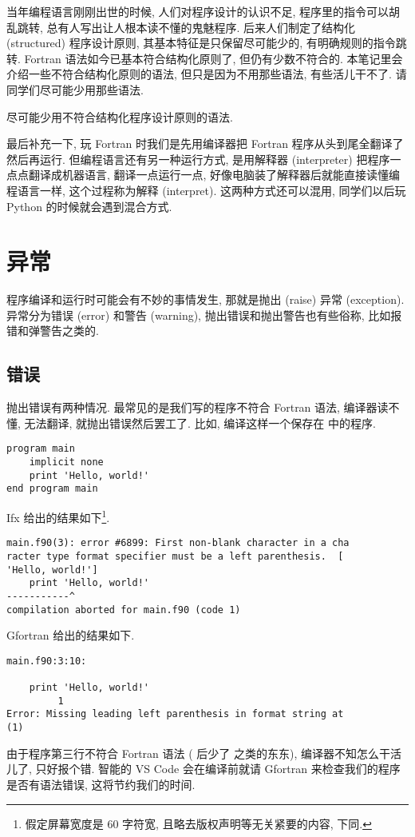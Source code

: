 当年编程语言刚刚出世的时候, 人们对程序设计的认识不足, 程序里的指令可以胡乱跳转, 总有人写出让人根本读不懂的鬼魅程序. 后来人们制定了结构化 (structured) 程序设计原则, 其基本特征是只保留尽可能少的, 有明确规则的指令跳转. Fortran 语法如今已基本符合结构化原则了, 但仍有少数不符合的. 本笔记里会介绍一些不符合结构化原则的语法, 但只是因为不用那些语法, 有些活儿干不了. 请同学们尽可能少用那些语法.
\begin{convention}
    尽可能少用不符合结构化程序设计原则的语法.\label{no_no_structured}
\end{convention}

最后补充一下, 玩 Fortran 时我们是先用编译器把 Fortran 程序从头到尾全翻译了然后再运行. 但编程语言还有另一种运行方式, 是用解释器 (interpreter) 把程序一点点翻译成机器语言, 翻译一点运行一点, 好像电脑装了解释器后就能直接读懂编程语言一样, 这个过程称为解释 (interpret). 这两种方式还可以混用, 同学们以后玩 Python 的时候就会遇到混合方式.

\section{异常}\label{fortran_exception}

程序编译和运行时可能会有不妙的事情发生, 那就是抛出 (raise) 异常 (exception). 异常分为错误 (error) 和警告 (warning), 抛出错误和抛出警告也有些俗称, 比如报错和弹警告之类的.

\subsection{错误}\label{fortran_error}

抛出错误有两种情况. 最常见的是我们写的程序不符合 Fortran 语法, 编译器读不懂, 无法翻译, 就抛出错误然后罢工了. 比如, 编译这样一个保存在  中的程序.
\begin{lstlisting}
program main
    implicit none
    print 'Hello, world!'
end program main
\end{lstlisting}
Ifx 给出的结果如下\footnote{
    假定屏幕宽度是 60 字符宽, 且略去版权声明等无关紧要的内容, 下同.
}.
\begin{verbatim}
main.f90(3): error #6899: First non-blank character in a cha
racter type format specifier must be a left parenthesis.  [
'Hello, world!']
    print 'Hello, world!'
-----------^
compilation aborted for main.f90 (code 1)
\end{verbatim}
Gfortran 给出的结果如下.
\begin{verbatim}
main.f90:3:10:

    print 'Hello, world!'
         1
Error: Missing leading left parenthesis in format string at 
(1)
\end{verbatim}
由于程序第三行不符合 Fortran 语法 ( 后少了 \ttt{*,} 之类的东东), 编译器不知怎么干活儿了, 只好报个错. 智能的 VS Code 会在编译前就请 Gfortran 来检查我们的程序是否有语法错误, 这将节约我们的时间.

